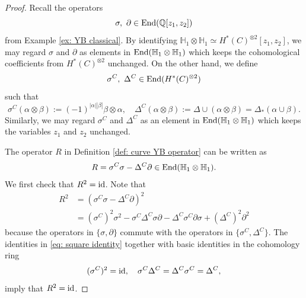 \documentclass[10pt]{amsart}
\newcommand{\BQ}{\mathbb{Q}}
\newcommand{\BH}{\mathbb{H}}
\newcommand{\End}{\textnormal{End}}
\newcommand{\id}{\textnormal{id}}
\newcommand{\+}{{}^+}
\theoremstyle{definition}
\theoremstyle {definition}
\theoremstyle {definition}
\begin{document}
\begin{proof}
Recall the operators 
$$\sigma,\ \partial\in \End(\BQ[z_1,z_2])$$ 
from Example \ref{ex: YB classical}. By identifying $\BH_1\otimes \BH_1\simeq H^*(C)^{\otimes 2}[z_1,z_2]$, we may regard $\sigma$ and $\partial$ as elements in $\End(\BH_1\otimes \BH_1)$ which keeps the cohomological coefficients from $H^*(C)^{\otimes 2}$ unchanged. On the other hand, we define 
$$\sigma^C,\ \Delta^C\in \End(H^*(C)^{\otimes 2})
$$
such that 
$$\sigma^C(\alpha\otimes \beta):=(-1)^{|\alpha||\beta|}\beta\otimes \alpha,\quad \Delta^C(\alpha\otimes \beta):=\Delta\cup(\alpha\otimes \beta)=\Delta_*(\alpha\cup \beta). 
$$
Similarly, we may regard $\sigma^C$ and $\Delta^C$ as an element in $\End(\BH_1\otimes \BH_1)$ which keeps the variables $z_1$ and $z_2$ unchanged. 

The operator $R$ in Definition \ref{def: curve YB operator} can be written as
$$R=\sigma^C\sigma-\Delta^C\partial\in \End(\BH_1\otimes \BH_1).
$$
We first check that $R^2=\id$. Note that
\begin{align*}
    R^2
    &=(\sigma^C\sigma-\Delta^C\partial)^2\\
    &=(\sigma^C)^2\sigma^2-\sigma^C\Delta^C\sigma\partial-\Delta^C\sigma^C\partial\sigma+(\Delta^C)^2\partial^2
\end{align*}
because the operators in $\{\sigma,\partial\}$ commute with the operators in $\{\sigma^C, \Delta^C\}$. The identities in \eqref{eq: square identity} together with basic identities in the cohomology ring
\begin{equation}\label{eq: diagonal identities}
    (\sigma^C)^2=\id,\quad \sigma^C\Delta^C=\Delta^C\sigma^C=\Delta^C,
\end{equation} 
imply that $R^2=\id$. 


\end{proof}
\end{document}
